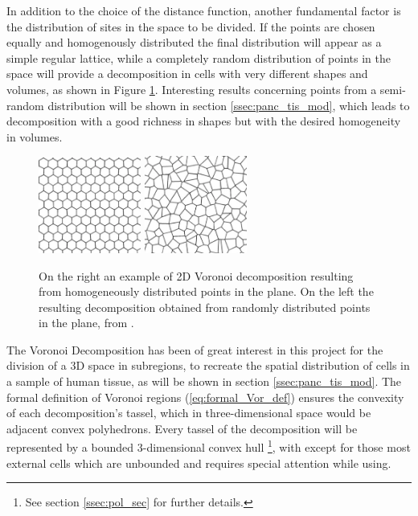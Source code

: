 In addition to the choice of the distance function, another fundamental factor is the distribution of sites in the space to be divided. If the points are chosen equally and homogenously distributed the final distribution will appear as a simple regular lattice, while a completely random distribution of points in the space will provide a decomposition in cells with very different shapes and volumes, as shown in Figure \ref{fig:diff_pt}. Interesting results concerning points from a semi-random distribution will be shown in section \ref{ssec:panc_tis_mod}, which leads to decomposition with a good richness in shapes but with the desired homogeneity in volumes.

\begin{figure}
    \centering
    \includegraphics[width = 0.3\textwidth]{images/reg_pt}
    \includegraphics[width = 0.3\textwidth]{images/ran_pt}
    \caption{On the right an example of 2D Voronoi decomposition resulting from homogeneously distributed points in the plane. On the left the resulting decomposition obtained from randomly distributed points in the plane, from \cite{ALSAYEDNOOR201644}.}
    \label{fig:diff_pt}
\end{figure}

The Voronoi Decomposition has been of great interest in this project for the division of a 3D space in subregions, to recreate the spatial distribution of cells in a sample of human tissue, as will be shown in section \ref{ssec:panc_tis_mod}. The formal definition of Voronoi regions (\ref{eq:formal_Vor_def}) ensures the convexity of each decomposition's tassel, which in three-dimensional space would be adjacent convex polyhedrons. Every tassel of the decomposition will be represented by a bounded 3-dimensional convex hull \footnote{See section \ref{ssec:pol_sec} for further details.}, with except for those most external cells which are unbounded and requires special attention while using.

